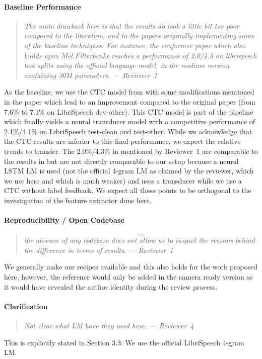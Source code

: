 \documentclass[11pt]{extarticle}
\begin{document}
\paragraph{Baseline Performance}
\begin{quote}\textit{
The main drawback here is that the results do look a little bit too poor compared to the literature, and to the papers originally implementing some of the baseline techniques.
For instance, the conformer paper which also builds upon Mel Filterbanks reaches a performance of 2.0/4.3 on librispeech test splits using the official language model, in the medium version containing 30M parameters.
--- Reviewer~1
}\end{quote}
As the baseline, we use the CTC model from \cite{zhou2022efficient} with some modifications mentioned in the paper which lead to an improvement compared to the original paper (from 7.6\% to 7.1\% on LibriSpeech dev-other).
This CTC model is part of the pipeline which finally yields a neural transducer model with a competitive performance of 2.1\%/4.1\% on LibriSpeech test-clean and test-other.
While we acknowledge that the CTC results are inferior to this final performance, we expect the relative trends to transfer.
The 2.0\%/4.3\% in \cite{google2020conformer} mentioned by Reviewer~1 are comparable to the results in \cite{zhou2022efficient} but are not directly comparable to our setup because a neural LSTM LM is used (not the official 4-gram LM as claimed by the reviewer, which we use here and which is much weaker) and \cite{google2020conformer} uses a transducer while we use a CTC without label feedback.
We expect all these points to be orthogonal to the investigation of the feature extractor done here.

\paragraph{Reproducibility / Open Codebase}
\begin{quote}\textit{
\[...\] the absence of any codebase does not allow us to inspect the reasons behind the difference in terms of results.
--- Reviewer~1
}\end{quote}
We generally make our recipes available and this also holds for the work proposed here, however, the reference would only be added in the camera ready version as it would have revealed the author identity during the review process.

\paragraph{Clarification}
\begin{quote}\textit{
Not clear what LM have they used here.
--- Reviewer~4
}\end{quote}
This is explicitly stated in Section 3.3: We use the official LibriSpeech 4-gram LM.



\end{document}
